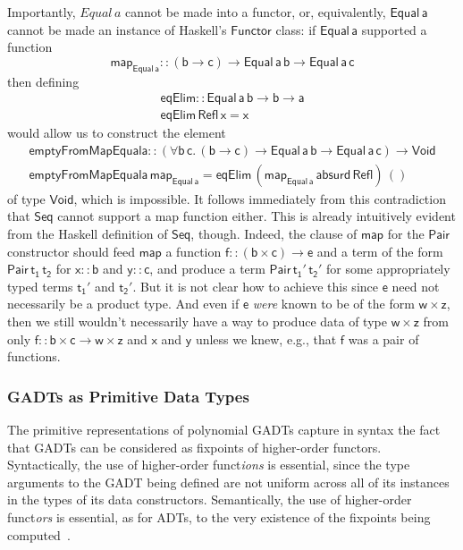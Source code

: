 \documentclass[acmsmall,screen,review,anonymous]{acmart}
\theoremstyle{definition}
\begin{document}
Importantly, $\mathit{Equal}\,a$ cannot be made into a functor, or,
equivalently, $\mathsf{Equal\,a}$ cannot be made an instance of
Haskell's $\mathsf{Functor}$ class: if $\mathsf{Equal\,a}$ supported a
function
\[\mathsf{map_{Equal\,a} :: (b \to c) \to Equal\,a\,b \to
  Equal\,a\,c}\]
then defining
\[\begin{array}{l}
\mathsf{eqElim :: Equal\, a\, b \to b \to a}\\
\mathsf{eqElim\, Refl\, x = x} 
\end{array}\]
would allow us to construct the element 
\[\begin{array}{l}
\mathsf{emptyFromMapEquala :: (\forall b\, c.\, (b \to c) \to Equal\, a\,
  b \to Equal\, a \,c) \to Void}\\ 
\mathsf{emptyFromMapEquala \,map_{Equal\,a} = eqElim\, (map_{Equal\,a}\,
  absurd\, Refl)\, ()}  
\end{array}\]
of type $\mathsf{Void}$, which is impossible. It follows immediately
from this contradiction that $\mathsf{Seq}$ cannot support a map
function either. This is already intuitively evident from the Haskell
definition of $\mathsf{Seq}$, though. Indeed, the clause of
$\mathsf{map}$ for the $\mathsf{Pair}$ constructor should feed
$\mathsf{map}$ a function $\mathsf{f :: (b \times c) \to e}$ and a
term of the form $\mathsf{Pair \,t_1\,t_2}$ for $\mathsf{x :: b}$ and
$\mathsf{y :: c}$, and produce a term $\mathsf{Pair\,t_1'\,t_2'}$ for
some appropriately typed terms $\mathsf{t_1'}$ and
$\mathsf{t_2'}$. But it is not clear how to achieve this since
$\mathsf{e}$ need not necessarily be a product type. And even if
$\mathsf{e}$ {\em were} known to be of the form $\mathsf{w \times z}$,
then we still wouldn't necessarily have a way to produce data of type
$\mathsf{w \times z}$ from only $\mathsf{f :: b \times c \to w \times
  z}$ and $\mathsf{x}$ and $\mathsf{y}$ unless we knew, e.g., that
$\mathsf{f}$ was a pair of functions.

\subsubsection{GADTs as Primitive Data Types}\label{sec:prim-gadts}

The primitive representations of {\color{blue} polynomial} GADTs
capture in syntax the fact that GADTs can be considered as fixpoints
of higher-order functors. Syntactically, the use of higher-order
funct{\em ions} is essential, since the type arguments to the GADT
being defined are not uniform across all of its instances in the types
of its data constructors. Semantically, the use of higher-order
funct{\em ors} is essential, as for ADTs, to the very existence of the
fixpoints being computed~\cite{tfca}.
\end{document}
